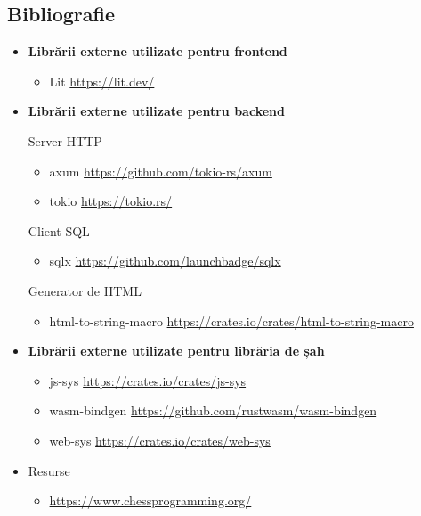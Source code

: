 \newpage
\begin{center}
	\section{Bibliografie}
\end{center}
\vspace{2cm}

\begin{itemize}
	\item \textbf{Librării externe utilizate pentru frontend}
	      \begin{itemize}
		      \item Lit \underline{https://lit.dev/}
	      \end{itemize}

	\item \textbf{Librării externe utilizate pentru backend}

	      Server HTTP
	      \begin{itemize}
		      \item axum \underline{https://github.com/tokio-rs/axum}
		      \item tokio \underline{https://tokio.rs/}
	      \end{itemize}

	      Client SQL
	      \begin{itemize}
		      \item sqlx \underline{https://github.com/launchbadge/sqlx}
	      \end{itemize}

	      Generator de HTML
	      \begin{itemize}
		      \item html-to-string-macro \underline{https://crates.io/crates/html-to-string-macro}
	      \end{itemize}

	\item \textbf{Librării externe utilizate pentru librăria de șah}
	      \begin{itemize}
		      \item js-sys \underline{https://crates.io/crates/js-sys}
		      \item wasm-bindgen \underline{https://github.com/rustwasm/wasm-bindgen}
		      \item web-sys \underline{https://crates.io/crates/web-sys}
	      \end{itemize}

	\item Resurse
	      \begin{itemize}
		      \item \underline{https://www.chessprogramming.org/}
	      \end{itemize}
\end{itemize}
